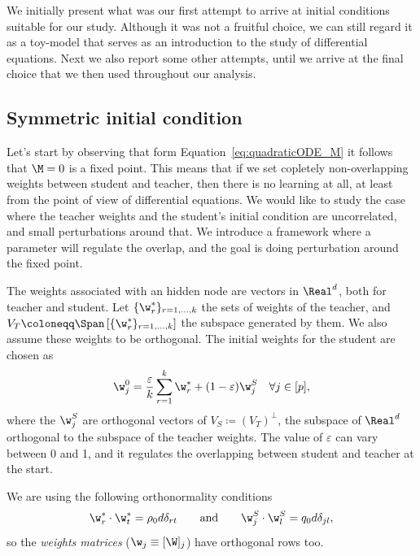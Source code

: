We initially present what was our first attempt to arrive at initial conditions suitable for our study.
Although it was not a fruitful choice,
we can still regard it as a toy-model that serves as an introduction to the study of differential equations.
Next we also report some other attempts, until we arrive at the final choice that we then used throughout our analysis.

\subsection{Symmetric initial condition}
Let's start by observing that form Equation~\eqref{eq:quadraticODE_M} it follows
that \(\M=0\) is a fixed point. This means that if we set copletely non-overlapping
weights between student and teacher, then there is no learning at all, at least 
from the point of view of differential equations.
We would like to study the case where the teacher weights and the student's initial condition are uncorrelated,
and small perturbations around that. We introduce a framework where a parameter will
regulate the overlap, and the goal is doing perturbation around the fixed point.

The weights associated with an hidden node are vectors in \(\Real^d\), both for teacher and student.
Let \(\{\w^*_r\}_{r=1,\dots,k}\) the sets of weights of the teacher,
and \(V_T \coloneqq \Span\left[\{\w^*_r\}_{r=1,\dots,k}\right]\) the subspace generated by them.
We also assume these weights to be orthogonal. The initial weights for the student are chosen as
\[
    \w_j^0 = \frac{\varepsilon}{k} \sum_{r=1}^k \w^*_r + (1-\varepsilon) \w_j^S \quad
    \forall j\in [p],
\]
where the \(\w_j^S\) are orthogonal vectors of \(V_S \coloneqq (V_T)^\bot\),
the subspace of \(\Real^d\) orthogonal to the subspace of the teacher weights. 
The value of \(\varepsilon\) can vary between 0 and 1,
and it regulates the overlapping between student and teacher at the start.

We are using the following orthonormality conditions
\[
  \w^*_r \cdot \w^*_t = \rho_0d\delta_{rt}
  \qquad\text{and}\qquad
  \w_j^S\cdot\w_l^S=q_0d\delta_{jl},
\]
so the \emph{weights matrices} (\(\w_j \equiv [\W]_j\)) have orthogonal rows too.

